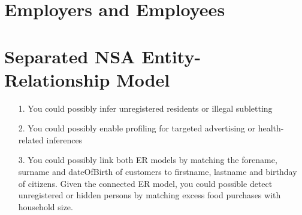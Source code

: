 \section{Employers and Employees }	
	
\section{Separated NSA Entity-Relationship Model }

\begin{itemize}
	\item[1.] You could possibly infer unregistered residents or illegal subletting
	\item[2.] You could possibly enable profiling for targeted advertising or health-related inferences
	\item[3.] You could possibly link both ER models by matching the forename, surname and dateOfBirth of customers to firstname, lastname and birthday of citizens. Given the connected ER model, you could possible detect unregistered or hidden persons by matching excess food purchases with household size.
\end{itemize}

